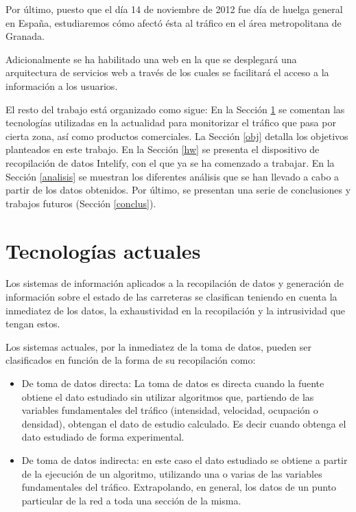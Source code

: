 \documentclass[twocolumn,twoside]{Jornadas}
\begin{document}
Por último, puesto que el día 14 de noviembre de 2012 fue día de huelga general en España, estudiaremos cómo afectó ésta al tráfico en el área metropolitana de Granada.


Adicionalmente se ha habilitado una web en la que se desplegará una arquitectura de servicios web \cite{Papazoglou2007,pgs2007} a través de los cuales se facilitará el acceso a la información a los usuarios.


El resto del trabajo está organizado como sigue:
En la Sección \ref{soa} se comentan las tecnologías utilizadas en la actualidad para monitorizar el tráfico que pasa por cierta zona, así como productos comerciales.
La Sección \ref{obj} detalla los objetivos planteados en este trabajo.
En la Sección \ref{hw} se presenta el dispositivo de recopilación de datos Intelify, con el que ya se ha comenzado a trabajar.
En la Sección \ref{analisis} se muestran los diferentes análisis que se han llevado a cabo a partir de los datos obtenidos.
Por último, se presentan una serie de conclusiones y trabajos futuros (Sección \ref{conclus}).


\section{Tecnologías actuales}
\label{soa}


Los sistemas de información aplicados a la recopilación de datos y generación de información sobre el estado de las carreteras 
se clasifican teniendo en cuenta la inmediatez de los datos, la exhaustividad en la recopilación y la intrusividad que tengan estos.

Los sistemas actuales, por la inmediatez de la toma de datos, pueden ser clasificados en función de la forma de su recopilación como:

\begin{itemize}
 \item De toma de datos directa: La toma de datos es directa cuando la fuente obtiene el dato estudiado sin utilizar algoritmos que, partiendo de las variables 
fundamentales del tráfico (intensidad, velocidad, ocupación o densidad), obtengan el dato de estudio calculado. Es decir cuando obtenga el dato estudiado de forma experimental.

 \item De toma de datos indirecta: en este caso el dato estudiado se obtiene a partir de la ejecución de un algoritmo, utilizando una o 
varias de las variables fundamentales del tráfico. Extrapolando, en general, los datos de un punto particular de la red a toda una sección de la misma.
\end{itemize}
\end{document}
